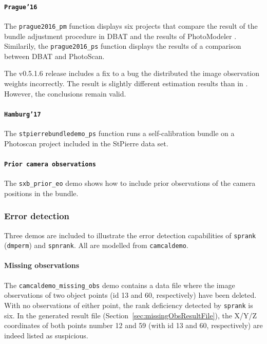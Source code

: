 \documentclass{article}
\begin{document}
\paragraph{\texttt{Prague'16}}
\label{sec:orge57eda8}
The \texttt{prague2016\_pm} function displays six projects that
compare the result of the bundle adjustment procedure in DBAT and the
results of PhotoModeler \citep{Borlin2016:External}. Similarily, the
\texttt{prague2016\_ps} function displays the results of a comparison
between DBAT and PhotoScan.

The v0.5.1.6 release includes a fix to a bug the distributed the image
observation weights incorrectly. The result is slightly different
estimation results than in \citet{Borlin2016:External}. However, the
conclusions remain valid.

\paragraph{\texttt{Hamburg'17}}
\label{sec:org7a085a6}
The \texttt{stpierrebundledemo\_ps} function runs a self-calibration
bundle on a Photoscan project included in the StPierre data set.

\paragraph{\texttt{Prior camera observations}}
\label{sec:org082e122}
The \texttt{sxb\_prior\_eo} demo shows how to include prior
observations of the camera positions in the bundle.

\subsubsection{Error detection}
\label{sec:org7ffacac}

Three demos are included to illustrate the error detection
capabilities of \texttt{sprank} (\texttt{dmperm}) and
\texttt{spnrank}. All are modelled from \texttt{camcaldemo}.

\paragraph{Missing observations}
\label{sec:org4fa97cb}

The \texttt{camcaldemo\_missing\_obs} demo contains a data file where the image
observations of two object points (id 13 and 60, respectively) have
been deleted. With no observations of either point, the rank
deficiency detected by \texttt{sprank} is six. In the generated result file
(Section~\ref{sec:missingObsResultFile}), the X/Y/Z coordinates
of both points number 12 and 59 (with id 13 and 60, respectively) are
indeed listed as suspicious.
\end{document}
